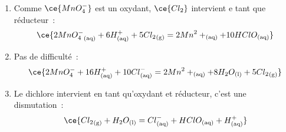 \documentclass[a4paper, 10pt, final, garamond]{book}
\begin{document}
{\begin{enumerate}[label=\alph*)]
\[{			      2 {MnO_4^{-}}_{\rm(aq)} + 16 {H}^+_{\rm(aq)} + 10 {Cl}^-_{\rm(aq)}
			      }
		      \]
		\item Comme $\ce{MnO_4^{-}}$ est un oxydant, $\ce{Cl_2}$ intervient e tant
		      que réducteur~:
		      \[
			      \ce{2 {MnO_4^{-}}_{\rm(aq)} + 6 {H}^+_{\rm(aq)} + 5 {Cl_2}_{\rm(g)} =
			      2 {Mn}^2+_{\rm(aq)} + 10 HClO_{\rm(aq)}}
		      \]
		\item Pas de difficulté~:
		      \[
			      \ce{2 {MnO_4^{-}} + 16 {H}^+_{\rm(aq)} + 10 {Cl}^- _{\rm(aq)} =
			      2 {Mn}^2+_{\rm(aq)} + 8 H_2O_{\rm(l)} + 5 {Cl_2}_{\rm(g)}}
		      \]
		\item Le dichlore intervient en tant qu'oxydant et réducteur, c'est une
		      dismutation~:
		      \[
			      \ce{{Cl_2}_{\rm(g)} + H_2O_{\rm(l)} = {Cl}^-_{\rm(aq)} + HClO_{\rm(aq)}+
			      {H}^+_{\rm(aq)}}
		      \]
	\end{enumerate}
}%

\resetQ
\end{document}
